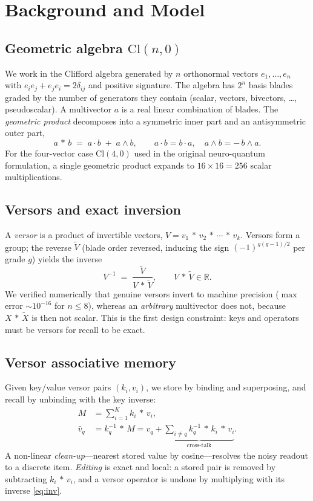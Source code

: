 \documentclass[10pt,twocolumn]{article}
\newcommand{\gp}{\,{*}\,}            %
\newcommand{\real}{\mathbb{R}}
\newcommand{\Cl}{\mathrm{Cl}}
\begin{document}
\section{Background and Model}

\subsection{Geometric algebra $\Cl(n,0)$}
We work in the Clifford algebra generated by $n$ orthonormal vectors
$e_1,\dots,e_n$ with $e_ie_j+e_je_i = 2\delta_{ij}$ and positive signature. The
algebra has $2^n$ basis blades graded by the number of generators they contain
(scalar, vectors, bivectors, \dots, pseudoscalar). A multivector $a$ is a real
linear combination of blades. The \emph{geometric product} decomposes into a
symmetric inner part and an antisymmetric outer part,
\begin{equation}
a \gp b \;=\; a\cdot b \;+\; a\wedge b ,\qquad
a\cdot b = b\cdot a,\quad a\wedge b = -\,b\wedge a .
\label{eq:gp}
\end{equation}
For the four-vector case $\Cl(4,0)$ used in the original neuro-quantum
formulation, a single geometric product expands to $16\times16=256$ scalar
multiplications.

\subsection{Versors and exact inversion}
A \emph{versor} is a product of invertible vectors, $V=v_1\gp v_2\gp\cdots\gp v_k$.
Versors form a group; the reverse $\widetilde V$ (blade order reversed, inducing
the sign $(-1)^{g(g-1)/2}$ per grade $g$) yields the inverse
\begin{equation}
V^{-1} \;=\; \frac{\widetilde V}{V\gp\widetilde V},\qquad V\gp\widetilde V \in \real .
\label{eq:inv}
\end{equation}
We verified numerically that genuine versors invert to machine precision
($\max$ error $\sim 10^{-16}$ for $n\le 8$), whereas an \emph{arbitrary}
multivector does not, because $X\gp\widetilde X$ is then not scalar. This is the
first design constraint: keys and operators must be versors for recall to be
exact.

\subsection{Versor associative memory}
Given key/value versor pairs $(k_i,v_i)$, we store by binding and superposing,
and recall by unbinding with the key inverse:
\begin{align}
M &= \sum_{i=1}^{K} k_i \gp v_i, \label{eq:store}\\
\widehat v_q &= k_q^{-1}\gp M
   = v_q + \underbrace{\sum_{i\neq q} k_q^{-1}\gp k_i \gp v_i}_{\text{cross-talk}} .
\label{eq:recall}
\end{align}
A non-linear \emph{clean-up}---nearest stored value by cosine---resolves the
noisy readout to a discrete item. \emph{Editing} is exact and local: a stored
pair is removed by subtracting $k_i\gp v_i$, and a versor operator is undone by
multiplying with its inverse \eqref{eq:inv}.
\end{document}
